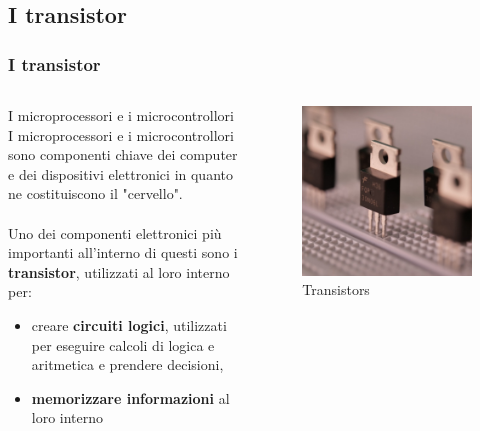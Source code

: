 \subsection[I transistor]{I transistor}
\begin{frame}
	\frametitle{I transistor}
	
	\begin{columns}			
		\begin{block}{I microprocessori e i microcontrollori}
			I microprocessori e i microcontrollori sono componenti chiave dei computer e dei dispositivi elettronici in quanto ne costituiscono il "cervello".\\~\\
			Uno dei componenti elettronici più importanti all'interno di questi sono i \textbf{transistor}, utilizzati al loro interno per:
			\begin{itemize}
				\item creare \textbf{circuiti logici}, utilizzati per eseguire calcoli di logica e aritmetica e prendere decisioni,
				\item \textbf{memorizzare informazioni} al loro interno
			\end{itemize} 
		\end{block}
		
		\begin{figure}[!htbp]
			\centering 
			\includegraphics[width=0.95\linewidth]{images/2_le_architetture/transistor.jpg}
			\caption{Transistors}
			\label{fig:architectures_transistors}
		\end{figure}		
	\end{columns}
	
\end{frame}




